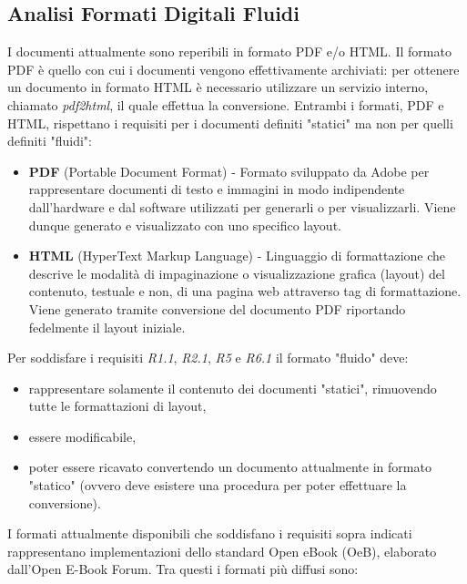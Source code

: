 \subsection{Analisi Formati Digitali Fluidi}
I documenti attualmente sono reperibili in formato PDF e/o HTML. Il formato PDF è quello con cui i documenti vengono effettivamente archiviati: per ottenere un documento in formato HTML è necessario utilizzare un servizio interno, chiamato \textit{pdf2html}, il quale effettua la conversione. Entrambi i formati, PDF e HTML, rispettano i requisiti per i documenti definiti "statici" ma non per quelli definiti "fluidi":
\begin{itemize}
    \item \textbf{PDF} (Portable Document Format) - Formato sviluppato da Adobe per rappresentare documenti di testo e immagini in modo indipendente dall'hardware e dal software utilizzati per generarli o per visualizzarli. Viene dunque generato e visualizzato con uno specifico layout.
    \item \textbf{HTML} (HyperText Markup Language) - Linguaggio di formattazione che descrive le modalità di impaginazione o visualizzazione grafica (layout) del contenuto, testuale e non, di una pagina web attraverso tag di formattazione. Viene generato tramite conversione del documento PDF riportando fedelmente il layout iniziale.
\end{itemize}
Per soddisfare i requisiti \textit{R1.1}, \textit{R2.1}, \textit{R5} e \textit{R6.1} il formato "fluido" deve:
\begin{itemize}
    \item rappresentare solamente il contenuto dei documenti "statici", rimuovendo tutte le formattazioni di layout,
    \item essere modificabile,
    \item poter essere ricavato convertendo un documento attualmente in formato "statico" (ovvero deve esistere una procedura per poter effettuare la conversione).
\end{itemize}
I formati attualmente disponibili che soddisfano i requisiti sopra indicati rappresentano implementazioni dello standard Open eBook (OeB), elaborato dall'Open E-Book Forum. Tra questi i formati più diffusi sono:
